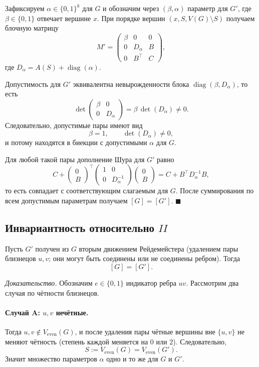 \documentclass[12pt,a4paper]{article}
\begin{document}
Зафиксируем $\alpha\in\{0,1\}^k$ для $G$ и обозначим через $(\beta,\alpha)$ параметр для $G'$, где
$\beta\in\{0,1\}$ отвечает вершине $x$.
При порядке вершин $(x,S,V(G)\setminus S)$ получаем блочную матрицу
\[
M'=
\begin{pmatrix}
\beta & 0 & 0\\
0 & D_\alpha & B\\
0 & B^\top & C
\end{pmatrix},
\]
где $D_\alpha=A(S)+\operatorname{diag}(\alpha)$.

Допустимость для $G'$ эквивалентна невырожденности блока
$\operatorname{diag}(\beta,D_\alpha)$, то есть
\[
\det\!\begin{pmatrix}\beta&0\\0&D_\alpha\end{pmatrix}
=\beta\,\det(D_\alpha)\neq0.
\]
Следовательно, допустимые пары имеют вид
\[
\beta=1,\qquad \det(D_\alpha)\neq0,
\]
и потому находятся в биекции с допустимыми $\alpha$ для $G$.

Для любой такой пары дополнение Шура для $G'$ равно
\[
C+
\begin{pmatrix}0\\B\end{pmatrix}^{\!\top}
\begin{pmatrix}1&0\\0&D_\alpha^{-1}\end{pmatrix}
\begin{pmatrix}0\\B\end{pmatrix}
=C+B^\top D_\alpha^{-1}B,
\]
то есть совпадает с соответствующим слагаемым для $G$.
После суммирования по всем допустимым параметрам получаем $[G]=[G']$.
$\blacksquare$

\subsection*{Инвариантность относительно $II$}

Пусть $G'$ получен из $G$ вторым движением Рейдемейстера (удалением пары близнецов $u,v$;
они могут быть соединены или не соединены ребром).
Тогда
\[
[G]=[G'].
\]

\textit{Доказательство.}
Обозначим $e\in\{0,1\}$ индикатор ребра $uv$.
Рассмотрим два случая по чётности близнецов.

\paragraph{Случай A: $u,v$ нечётные.}
Тогда $u,v\notin V_{\mathrm{even}}(G)$, и после удаления пары чётные вершины вне $\{u,v\}$ не меняют чётность
(степень каждой меняется на $0$ или $2$).
Следовательно,
\[
S:=V_{\mathrm{even}}(G)=V_{\mathrm{even}}(G').
\]
Значит множество параметров $\alpha$ одно и то же для $G$ и $G'$.
\end{document}
